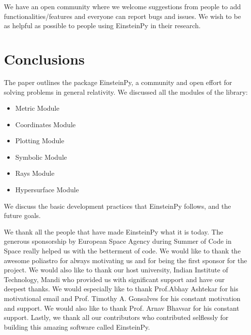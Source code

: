 \documentclass[refree]{aa}
\begin{document}
We have an open community where we welcome suggestions from people to add functionalities/features and everyone can report bugs and issues. We wish to be as helpful as possible to people using EinsteinPy in their research.


\section{Conclusions}
The paper outlines the package EinsteinPy, a community and open effort for solving problems in general relativity. We discussed all the modules of the library:
\begin{itemize}
\item Metric Module
\item Coordinates Module
\item Plotting Module
\item Symbolic Module
\item Rays Module
\item Hypersurface Module
\end{itemize}

We discuss the basic development practices that EinsteinPy follows, and the future goals.



\begin{acknowledgements}
      We thank all the people that have made EinsteinPy what it is today.  
The generous sponsorship by European Space Agency during Summer of Code in Space really helped us with the betterment of code. We would like to thank the awesome poliastro \citep{juan_luis_cano_rodriguez_2019_3588160} for always motivating us and for being the first sponsor for the project. We would also like to thank our host university, Indian Institute of Technology, Mandi who provided us with significant support and have our deepest thanks.
We would especially like to thank Prof.Abhay Ashtekar for his motivational email and  Prof. Timothy A. Gonsalves for his constant motivation and support. We would also like to thank Prof. Arnav Bhavsar for his constant support.
Lastly, we thank all our contributors who contributed selflessly for building this amazing software called EinsteinPy.
      
\end{acknowledgements}

%
%





\end{document}
